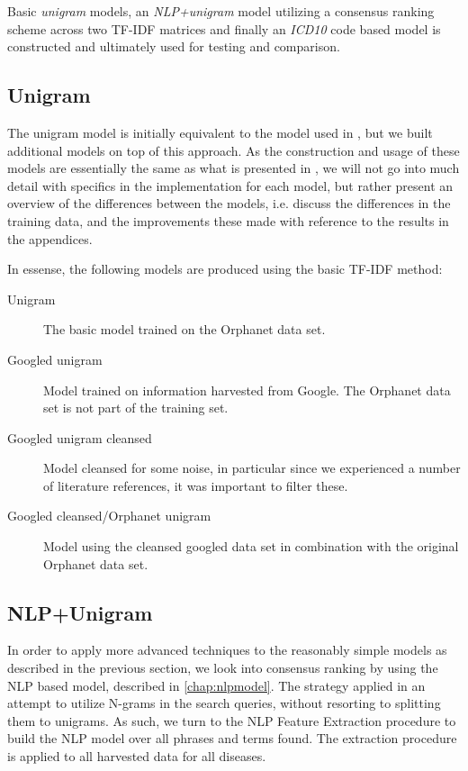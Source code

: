 \documentclass[10pt,letterpaper,final]{article}
\begin{document}
Basic \textit{unigram} models, an \textit{NLP+unigram} model utilizing a
consensus ranking scheme across two TF-IDF matrices and finally an
\textit{ICD10} code based model is constructed and ultimately used for
testing and comparison.


\subsection{Unigram}
\label{chap:unigrammethod}
The unigram model is initially equivalent to the model used in
\cite{jensenandersen}, but we built additional models on top of this
approach. As the construction and usage of these models are essentially
the same as what is presented in \cite{jensenandersen}, we will not go
into much detail with specifics in the implementation for each model,
but rather present an overview of the differences between the models,
i.e. discuss the differences in the training data, and the improvements
these made with reference to the results in the appendices.

In essense, the following models are produced using the basic TF-IDF
method:

\begin{description}
\item[Unigram] The basic model trained on the Orphanet data set.
\item[Googled unigram] Model trained on information harvested from
Google. The Orphanet data set is not part of the training set.
\item[Googled unigram cleansed] Model cleansed for some noise, in
particular since we experienced a number of literature references, it
was important to filter these.
\item[Googled cleansed/Orphanet unigram] Model using the cleansed
googled data set in combination with the original Orphanet data set.
\end{description}



\subsection{NLP+Unigram}
In order to apply more advanced techniques to the reasonably simple
models as described in the previous section, we look into consensus
ranking by using the NLP based model, described in \ref{chap:nlpmodel}.
The strategy applied in an attempt to utilize N-grams in the search
queries, without resorting to splitting them to unigrams. As such, we
turn to the NLP Feature Extraction procedure to build the NLP model over
all phrases and terms found. The extraction procedure is applied to
all harvested data for all diseases.
\end{document}
